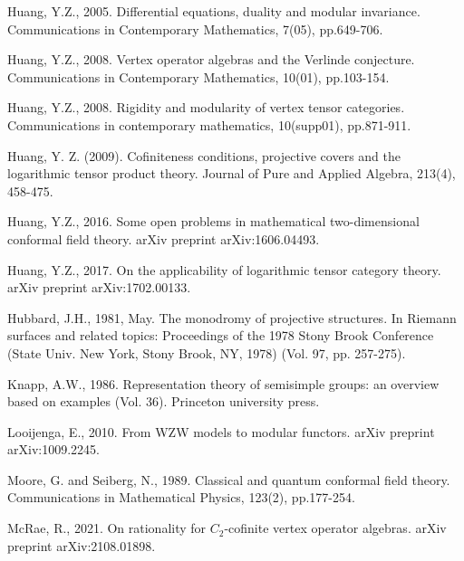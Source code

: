 \documentclass[12pt,a4paper,notitlepage]{article}
\theoremstyle{definition}
\theoremstyle{plain}
\numberwithin{equation}{section}
\begin{document}
\begin{thebibliography}{999999}
Huang, Y.Z., 2005. Differential equations, duality and modular invariance. Communications in Contemporary Mathematics, 7(05), pp.649-706.

Huang, Y.Z., 2008. Vertex operator algebras and the Verlinde conjecture. Communications in Contemporary Mathematics, 10(01), pp.103-154.

Huang, Y.Z., 2008. Rigidity and modularity of vertex tensor categories. Communications in contemporary mathematics, 10(supp01), pp.871-911.

Huang, Y. Z. (2009). Cofiniteness conditions, projective covers and the logarithmic tensor product theory. Journal of Pure and Applied Algebra, 213(4), 458-475.

Huang, Y.Z., 2016. Some open problems in mathematical two-dimensional conformal field theory. arXiv preprint arXiv:1606.04493.

Huang, Y.Z., 2017. On the applicability of logarithmic tensor category theory. arXiv preprint arXiv:1702.00133.

Hubbard, J.H., 1981, May. The monodromy of projective structures. In Riemann surfaces and related topics: Proceedings of the 1978 Stony Brook Conference (State Univ. New York, Stony Brook, NY, 1978) (Vol. 97, pp. 257-275).
		



Knapp, A.W., 1986. Representation theory of semisimple groups: an overview based on examples (Vol. 36). Princeton university press.




Looijenga, E., 2010. From WZW models to modular functors. arXiv preprint arXiv:1009.2245.

Moore, G. and Seiberg, N., 1989. Classical and quantum conformal field theory. Communications in Mathematical Physics, 123(2), pp.177-254.


McRae, R., 2021. On rationality for $C_2$-cofinite vertex operator algebras. arXiv preprint arXiv:2108.01898.


\end{thebibliography}
\end{document}
